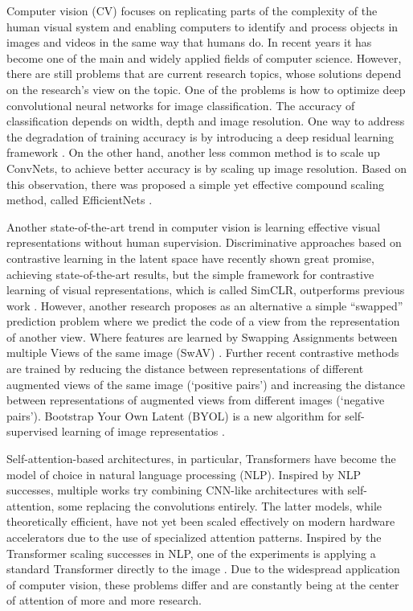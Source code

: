 \documentclass[
]{krantz}
\begin{document}
Computer vision (CV) focuses on replicating parts of the complexity of the human visual system and enabling computers to identify and process objects in images and videos in the same way that humans do. In recent years it has become one of the main and widely applied fields of computer science. However, there are still problems that are current research topics, whose solutions depend on the research's view on the topic. One of the problems is how to optimize deep convolutional neural networks for image classification. The accuracy of classification depends on width, depth and image resolution. One way to address the degradation of training accuracy is by introducing a deep residual learning framework \citep{ResNet}. On the other hand, another less common method is to scale up ConvNets, to achieve better accuracy is by scaling up image resolution. Based on this observation, there was proposed a simple yet effective compound scaling method, called EfficientNets \citep{EfficientNet}.

Another state-of-the-art trend in computer vision is learning effective visual representations without human supervision. Discriminative approaches based on contrastive learning in the latent space have recently shown great promise, achieving state-of-the-art results, but the simple framework for contrastive learning of visual representations, which is called SimCLR, outperforms previous work \citep{SimCLR}. However, another research proposes as an alternative a simple ``swapped'' prediction problem where we predict the code of a view from the representation of another view. Where features are learned by Swapping Assignments between multiple Views of the same image (SwAV) \citep{SwAV}.
Further recent contrastive methods are trained by reducing the distance between representations of different augmented views of the same image (`positive pairs') and increasing the distance between representations of augmented views from different images (`negative pairs'). Bootstrap Your Own Latent (BYOL) is a new algorithm for self-supervised learning of image representatios \citep{BYOL}.

Self-attention-based architectures, in particular, Transformers have become the model of choice in natural language processing (NLP). Inspired by NLP successes, multiple works try combining CNN-like architectures with self-attention, some replacing the convolutions entirely. The latter models, while theoretically efficient, have not yet been scaled effectively on modern hardware accelerators due to the use of specialized attention patterns. Inspired by the Transformer scaling successes in NLP, one of the experiments is applying a standard Transformer directly to the image \citep{ImageT}. Due to the widespread application of computer vision, these problems differ and are constantly being at the center of attention of more and more research.
\end{document}
